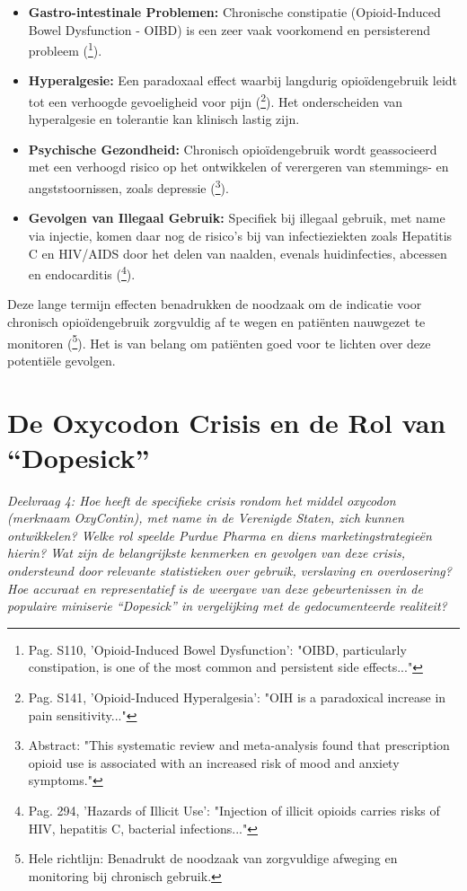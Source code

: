\documentclass[11pt, a4paper]{report} %
\begin{document}
\begin{itemize}
    \item \textbf{Gastro-intestinale Problemen:} Chronische constipatie (Opioid-Induced Bowel Dysfunction - OIBD) is een zeer vaak voorkomend en persisterend probleem (\cite{Benyamin2008OpioidComplications}\footnote{Pag. S110, 'Opioid-Induced Bowel Dysfunction': "OIBD, particularly constipation, is one of the most common and persistent side effects..."}).
    \item \textbf{Hyperalgesie:} Een paradoxaal effect waarbij langdurig opioïdengebruik leidt tot een verhoogde gevoeligheid voor pijn (\cite{Trescot2008OpioidPharm}\footnote{Pag. S141, 'Opioid-Induced Hyperalgesia': "OIH is a paradoxical increase in pain sensitivity..."}). Het onderscheiden van hyperalgesie en tolerantie kan klinisch lastig zijn.
    \item \textbf{Psychische Gezondheid:} Chronisch opioïdengebruik wordt geassocieerd met een verhoogd risico op het ontwikkelen of verergeren van stemmings- en angststoornissen, zoals depressie (\cite{Dale2022MoodAnxiety}\footnote{Abstract: "This systematic review and meta-analysis found that prescription opioid use is associated with an increased risk of mood and anxiety symptoms."}).
    \item \textbf{Gevolgen van Illegaal Gebruik:} Specifiek bij illegaal gebruik, met name via injectie, komen daar nog de risico's bij van infectieziekten zoals Hepatitis C en HIV/AIDS door het delen van naalden, evenals huidinfecties, abcessen en endocarditis (\cite{Gupta2010ChemistryOpioids}\footnote{Pag. 294, 'Hazards of Illicit Use': "Injection of illicit opioids carries risks of HIV, hepatitis C, bacterial infections..."}).
\end{itemize}
Deze lange termijn effecten benadrukken de noodzaak om de indicatie voor chronisch opioïdengebruik zorgvuldig af te wegen en patiënten nauwgezet te monitoren (\cite{Dowell2016CDCGuideline}\footnote{Hele richtlijn: Benadrukt de noodzaak van zorgvuldige afweging en monitoring bij chronisch gebruik.}). Het is van belang om patiënten goed voor te lichten over deze potentiële gevolgen.

\chapter{De Oxycodon Crisis en de Rol van \enquote{Dopesick}}
\label{ch:oxycrisis}
\textit{Deelvraag 4: Hoe heeft de specifieke crisis rondom het middel oxycodon (merknaam OxyContin), met name in de Verenigde Staten, zich kunnen ontwikkelen? Welke rol speelde Purdue Pharma en diens marketingstrategieën hierin? Wat zijn de belangrijkste kenmerken en gevolgen van deze crisis, ondersteund door relevante statistieken over gebruik, verslaving en overdosering? Hoe accuraat en representatief is de weergave van deze gebeurtenissen in de populaire miniserie \enquote{Dopesick} in vergelijking met de gedocumenteerde realiteit?}
\end{document}
